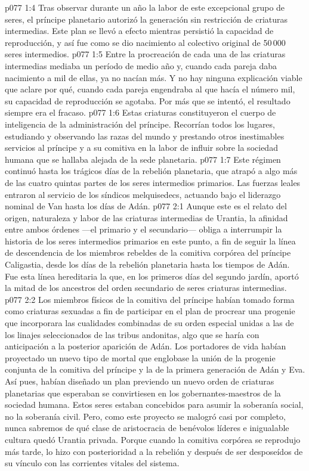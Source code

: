\vs p077 1:4 Tras observar durante un año la labor de este excepcional grupo de seres, el príncipe planetario autorizó la generación sin restricción de criaturas intermedias. Este plan se llevó a efecto mientras persistió la capacidad de reproducción, y así fue como se dio nacimiento al colectivo original de 50\,000 seres intermedios.
\vs p077 1:5 Entre la procreación de cada una de las criaturas intermedias mediaba un período de medio año y, cuando cada pareja daba nacimiento a mil de ellas, ya no nacían más. Y no hay ninguna explicación viable que aclare por qué, cuando cada pareja engendraba al que hacía el número mil, su capacidad de reproducción se agotaba. Por más que se intentó, el resultado siempre era el fracaso.
\vs p077 1:6 \pc Estas criaturas constituyeron el cuerpo de inteligencia de la administración del príncipe. Recorrían todos los lugares, estudiando y observando las razas del mundo y prestando otros inestimables servicios al príncipe y a su comitiva en la labor de influir sobre la sociedad humana que se hallaba alejada de la sede planetaria.
\vs p077 1:7 Este régimen continuó hasta los trágicos días de la rebelión planetaria, que atrapó a algo más de las cuatro quintas partes de los seres intermedios primarios. Las fuerzas leales entraron al servicio de los síndicos melquisedecs, actuando bajo el liderazgo nominal de Van hasta los días de Adán.
\vs p077 2:1 Aunque este es el relato del origen, naturaleza y labor de las criaturas intermedias de Urantia, la afinidad entre ambos órdenes ---el primario y el secundario--- obliga a interrumpir la historia de los seres intermedios primarios en este punto, a fin de seguir la línea de descendencia de los miembros rebeldes de la comitiva corpórea del príncipe Caligastia, desde los días de la rebelión planetaria hasta los tiempos de Adán. Fue esta línea hereditaria la que, en los primeros días del segundo jardín, aportó la mitad de los ancestros del orden secundario de seres criaturas intermedias.
\vs p077 2:2 \pc Los miembros físicos de la comitiva del príncipe habían tomado forma como criaturas sexuadas a fin de participar en el plan de procrear una progenie que incorporara las cualidades combinadas de su orden especial unidas a las de los linajes seleccionados de las tribus andonitas, algo que se haría con anticipación a la posterior aparición de Adán. Los portadores de vida habían proyectado un nuevo tipo de mortal que englobase la unión de la progenie conjunta de la comitiva del príncipe y la de la primera generación de Adán y Eva. Así pues, habían diseñado un plan previendo un nuevo orden de criaturas planetarias que esperaban se convirtiesen en los gobernantes\hyp{}maestros de la sociedad humana. Estos seres estaban concebidos para asumir la soberanía social, no la soberanía civil. Pero, como este proyecto se malogró casi por completo, nunca sabremos de qué clase de aristocracia de benévolos líderes e inigualable cultura quedó Urantia privada. Porque cuando la comitiva corpórea se reprodujo más tarde, lo hizo con posterioridad a la rebelión y después de ser desposeídos de su vínculo con las corrientes vitales del sistema.
